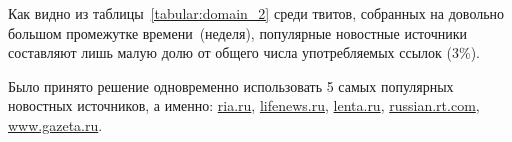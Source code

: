         Как видно из таблицы~\ref{tabular:domain_2} среди твитов, собранных на довольно большом промежутке времени~(неделя), популярные новостные источники
        составляют лишь малую долю от общего числа употребляемых ссылок (3\%).

        Было принято решение одновременно использовать 5 самых популярных новостных источников, а именно: \url{ria.ru},
        \url{lifenews.ru}, \url{lenta.ru}, \url{russian.rt.com}, \url{www.gazeta.ru}.


        \clearpage



